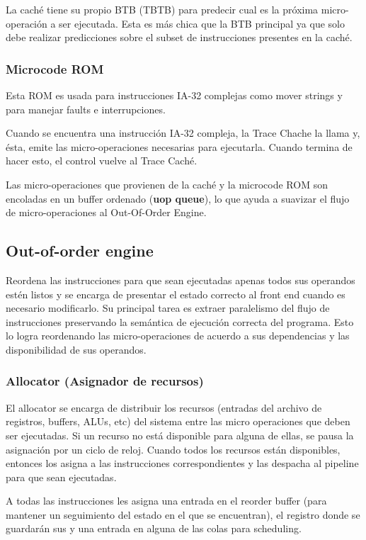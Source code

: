 La caché tiene su propio BTB (TBTB) para predecir cual es la próxima micro-operación a ser ejecutada. Esta es más chica que la BTB principal ya que solo debe realizar predicciones sobre el subset de instrucciones presentes en la caché.

\subsubsection*{Microcode ROM}
Esta ROM es usada para instrucciones IA-32 complejas como mover strings y para manejar faults e interrupciones.

Cuando se encuentra una instrucción IA-32 compleja, la Trace Chache la llama y, ésta, emite las micro-operaciones necesarias para ejecutarla. Cuando termina de hacer esto, el control vuelve al Trace Caché.

Las micro-operaciones que provienen de la caché y la microcode ROM son encoladas en un buffer ordenado (\textbf{uop queue}), lo que ayuda a suavizar el flujo de micro-operaciones al Out-Of-Order Engine.

\subsection{Out-of-order engine}
Reordena las instrucciones para que sean ejecutadas apenas todos sus operandos estén listos y se encarga de presentar el estado correcto al front end cuando es necesario modificarlo. Su principal tarea es extraer paralelismo del flujo de instrucciones preservando la semántica de ejecución correcta del programa. Esto lo logra reordenando las micro-operaciones de acuerdo a sus dependencias y las disponibilidad de sus operandos.


\subsubsection*{Allocator (Asignador de recursos)}
El allocator se encarga de distribuir los recursos (entradas del archivo de registros, buffers, ALUs, etc) del sistema entre las micro operaciones que deben ser ejecutadas. Si un recurso no está disponible para alguna de ellas, se pausa la asignación por un ciclo de reloj. Cuando todos los recursos están disponibles, entonces los asigna a las instrucciones correspondientes y las despacha al pipeline para que sean ejecutadas.

A todas las instrucciones les asigna una entrada en el reorder buffer (para mantener un seguimiento del estado en el que se encuentran), el registro donde se guardarán sus y una entrada en alguna de las colas para scheduling.

